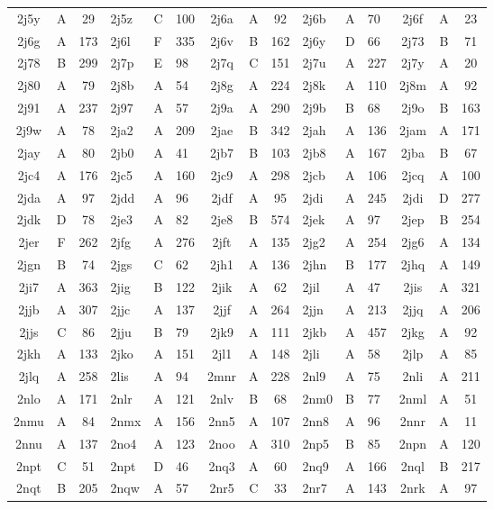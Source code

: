 \begin{longtable}{|c|c|c| a|a|a| c|c|c| a|a|a| c|c|c|}
2j5y & A & 29 & 2j5z & C & 100 & 2j6a & A & 92 & 2j6b & A & 70 & 2j6f & A & 23\\
2j6g & A & 173 & 2j6l & F & 335 & 2j6v & B & 162 & 2j6y & D & 66 & 2j73 & B & 71\\
2j78 & B & 299 & 2j7p & E & 98 & 2j7q & C & 151 & 2j7u & A & 227 & 2j7y & A & 20\\
2j80 & A & 79 & 2j8b & A & 54 & 2j8g & A & 224 & 2j8k & A & 110 & 2j8m & A & 92\\
2j91 & A & 237 & 2j97 & A & 57 & 2j9a & A & 290 & 2j9b & B & 68 & 2j9o & B & 163\\
2j9w & A & 78 & 2ja2 & A & 209 & 2jae & B & 342 & 2jah & A & 136 & 2jam & A & 171\\
2jay & A & 80 & 2jb0 & A & 41 & 2jb7 & B & 103 & 2jb8 & A & 167 & 2jba & B & 67\\
2jc4 & A & 176 & 2jc5 & A & 160 & 2jc9 & A & 298 & 2jcb & A & 106 & 2jcq & A & 100\\
2jda & A & 97 & 2jdd & A & 96 & 2jdf & A & 95 & 2jdi & A & 245 & 2jdi & D & 277\\
2jdk & D & 78 & 2je3 & A & 82 & 2je8 & B & 574 & 2jek & A & 97 & 2jep & B & 254\\
2jer & F & 262 & 2jfg & A & 276 & 2jft & A & 135 & 2jg2 & A & 254 & 2jg6 & A & 134\\
2jgn & B & 74 & 2jgs & C & 62 & 2jh1 & A & 136 & 2jhn & B & 177 & 2jhq & A & 149\\
2ji7 & A & 363 & 2jig & B & 122 & 2jik & A & 62 & 2jil & A & 47 & 2jis & A & 321\\
2jjb & A & 307 & 2jjc & A & 137 & 2jjf & A & 264 & 2jjn & A & 213 & 2jjq & A & 206\\
2jjs & C & 86 & 2jju & B & 79 & 2jk9 & A & 111 & 2jkb & A & 457 & 2jkg & A & 92\\
2jkh & A & 133 & 2jko & A & 151 & 2jl1 & A & 148 & 2jli & A & 58 & 2jlp & A & 85\\
2jlq & A & 258 & 2lis & A & 94 & 2mnr & A & 228 & 2nl9 & A & 75 & 2nli & A & 211\\
2nlo & A & 171 & 2nlr & A & 121 & 2nlv & B & 68 & 2nm0 & B & 77 & 2nml & A & 51\\
2nmu & A & 84 & 2nmx & A & 156 & 2nn5 & A & 107 & 2nn8 & A & 96 & 2nnr & A & 11\\
2nnu & A & 137 & 2no4 & A & 123 & 2noo & A & 310 & 2np5 & B & 85 & 2npn & A & 120\\
2npt & C & 51 & 2npt & D & 46 & 2nq3 & A & 60 & 2nq9 & A & 166 & 2nql & B & 217\\
2nqt & B & 205 & 2nqw & A & 57 & 2nr5 & C & 33 & 2nr7 & A & 143 & 2nrk & A & 97\\

\end{longtable}
